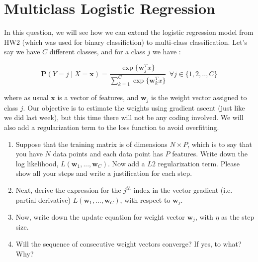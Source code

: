 \newcommand{\pr}{\mathbf{P}}  %
\newcommand{\vw}{\mathbf{w}}
\newcommand{\vx}{\mathbf{x}}

\section{Multiclass Logistic Regression}
In this question, we will see how we can extend the logistic regression model from HW2 (which was used for binary classifiction) to multi-class classification. Let's say we have $C$ different classes, and for a class $j$ we have :

$$ \pr(Y = j \mid X = \mathbf{x}) = \frac{\exp\{\vw_j^Tx\}}{\sum_{k=1}^{C} \exp\{\vw_k^Tx\}}  \ \ \forall j \in \{1, 2, .., C\}$$

where as usual $\mathbf{x}$ is a vector of features, and $\vw_j$ is the weight vector assigned to class $j$. Our objective is to estimate the weights using gradient ascent (just like we did last week), but this time there will not be any coding involved. We will also add a regularization term to the loss function to avoid overfitting.

\begin{enumerate}
\item Suppose that the training matrix is of dimensions $N \times P$, which is to say that you have $N$ data points and each data point has $P$ features. Write down the log likelihood, $L(\vw_1, ..., \vw_C)$. Now add a $L2$ regularization term. Please show all your steps and write a justification for each step.

\item Next, derive the expression for the $j^{th}$ index in the vector gradient (i.e. partial derivative) $L(\vw_1, ..., \vw_C)$, with respect to $\vw_j$.

\item Now, write down the update equation for weight vector $\vw_j$, with $\eta$ as the step size.

\item Will the sequence of consecutive weight vectors converge? If yes, to what? Why?

\end{enumerate}










